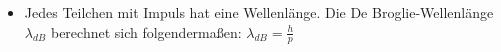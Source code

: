\begin{itemize}
\item Jedes Teilchen mit Impuls hat eine Wellenlänge. Die De Broglie-Wellenlänge $\lambda_{dB}$ berechnet sich folgendermaßen: $\lambda_{dB} = \frac{h}{p}$
\end{itemize}